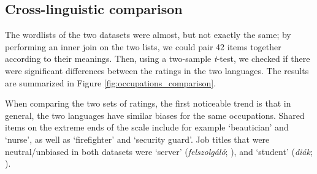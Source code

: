 \documentclass[11pt]{article}
\newcommand{\zh}[1]{\simplifiedchinesefont{#1}\rmfamily}
\begin{document}
\subsection{Cross-linguistic comparison}


The wordlists of the two datasets were almost, but not exactly the same; by performing an inner join on the two lists, we could pair 42 items together according to their meanings. Then, using a two-sample \textit{t}-test, we checked if there were significant differences between the ratings in the two languages. The results are summarized in Figure \ref{fig:occupations_comparison}.

When comparing the two sets of ratings, the first noticeable trend is that in general, the two languages have similar biases for the same occupations. Shared items on the extreme ends of the scale include for example `beautician' and `nurse', as well as `firefighter' and `security guard'. Job titles that were neutral/unbiased in both datasets were `server' (\textit{felszolgáló}; \zh{服务员}), and `student' (\textit{diák}; \zh{学生}).

\end{document}
